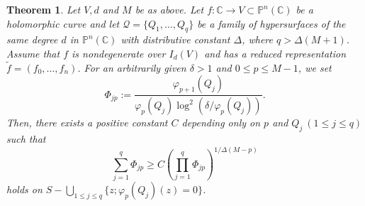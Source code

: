 \documentclass[12pt]{amsart}
\newtheorem{theorem}{Theorem}[section]
\newcommand{\C}{{\mathbb{C}}}
\renewcommand{\P}{{\mathbb{P}}}
\begin{document}
\begin{theorem}\label{3.4}
Let $V,d$ and $M$ be as above. Let $f:\C\rightarrow V\subset\P^n(\C)$ be a holomorphic curve and let $\mathcal Q=\{Q_1,\ldots, Q_q\}$ be a family of hypersurfaces of the same degree $d$ in $\P^n(\C)$ with distributive constant $\Delta$, where $q>\Delta(M+1)$. Assume that $f$ is nondegenerate over $I_d(V)$ and has a reduced representation $\tilde f=(f_0,\ldots,f_n)$. For an arbitrarily given $\delta >1$ and $0\le p\le M-1$, we set
$$\Phi_{jp}:=\dfrac{\varphi_{p+1}(Q_j)}{\varphi_{p}(Q_j)\log^2\left (\delta/\varphi_{p}(Q_j)\right)}.$$
Then, there exists a positive constant $C$ depending only on $p$ and $Q_j\ (1\le j\le q)$ such that
$$ \sum_{j=1}^q\Phi_{jp}\ge C\left (\prod_{j=1}^q\Phi_{jp}\right)^{1/\Delta(M-p)}$$
holds on $S-\bigcup_{1\le j\le q}\{z;\varphi_{p}(Q_j)(z)=0\}$.
\end{theorem}
\end{document}
